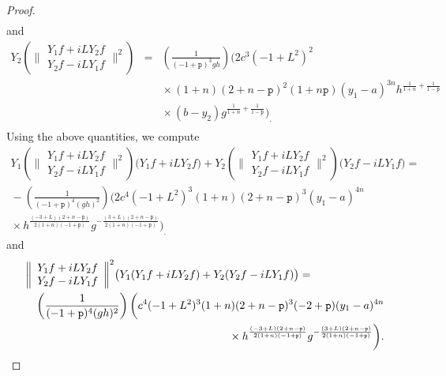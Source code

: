 \documentclass[12pt]{amsart}
\theoremstyle{plain}
\theoremstyle{definition}
\numberwithin{equation}{section}
\begin{document}
\begin{proof}
\begin{eqnarray*}
\end{eqnarray*}
and
\begin{eqnarray*}
Y_2\left( \bigg\| \begin{array}{c}
 Y_1f+iLY_2f\\
 Y_2f-iLY_1f
\end{array} \bigg\|^{2}\right)
& = & \left(\frac{1}{(-1 + {\texttt{p}})^3 gh}\right)\bigg(2 c^3 (-1 + L^2)^2\\
&&\mbox{} \times(1 + n) (2 + n - {\texttt{p}})^2 (1 + n {\texttt{p}}) ( y_1-a)^{3 n}h^{\frac{1}{1 + n}+ \frac{1}{1 - {\texttt{p}}}} \\
&&\mbox{}\times(b - y_2) g^{\frac{1}{1 + n} +\frac{1}{1 - {\texttt{p}}}} \bigg)_. \\
\end{eqnarray*}
Using the above quantities, we compute
\begin{eqnarray}
Y_1\left( \bigg\| \begin{array}{c}
 Y_1f+iLY_2f\\
 Y_2f-iLY_1f
\end{array} \bigg\|^{2}\right)\big(Y_1f+iLY_2f\big)
+Y_2\left( \bigg\| \begin{array}{c}
 Y_1f+iLY_2f\\
 Y_2f-iLY_1f
\end{array} \bigg\|^{2}\right)\big(Y_2f-iLY_1f\big)=\nonumber \\
 \mbox{}-\left(\frac{1}{(-1 + {\texttt{p}})^4 (gh)^2}\right)\bigg(2 c^4 (-1 + L^2)^3 (1 + n) (2 + n - {\texttt{p}})^3 (y_1-a)^{4 n}\label{gpart1} \\
 \mbox{}\times h^{\frac{(-3 + L) (2 + n - {\texttt{p}})}{2 (1 + n) (-1 + {\texttt{p}})}}
g^{-\frac{(3 + L) (2 + n - {\texttt{p}})}{2 (1 + n) (-1 + {\texttt{p}})}}\bigg)_. \nonumber
\end{eqnarray}
and
\begin{eqnarray*}
\lefteqn{\bigg\| \begin{array}{c}
 Y_1f+iLY_2f\\
 Y_2f-iLY_1f
\end{array} \bigg\|^{2}\big(Y_1(Y_1f+iLY_2f)+Y_2(Y_2f-iLY_1f)\big)=} && \\
& &\left(\frac{1}{(-1 + {\texttt{p}})^4 (gh)^2} \right)
\bigg(c^4 (-1 + L^2)^3 (1 + n) (2 + n - {\texttt{p}})^3 (-2 + {\texttt{p}}) (y_1-a)^{4 n} \\
&&\mbox{} \times h^{\frac{(-3 +L)(2 + n - {\texttt{p}})}{2 (1 + n) (-1 + {\texttt{p}})}} g^{-\frac{(3 + L) (2 + n - {\texttt{p}})}{2 (1 + n) (-1 + {\texttt{p}})}}\bigg).
\end{eqnarray*}

\end{proof}
\end{document}
